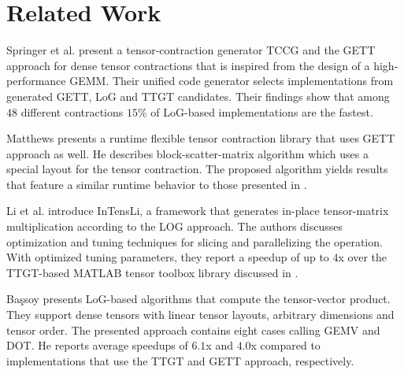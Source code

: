 \section{Related Work}
\label{sec:related}

\begin{comment}
The authors in \cite{dinapoli:2014:towards.efficient.use} discuss the efficient tensor contractions with highly optimized BLAS. 
Based on the LoG approach, they define requirements for the use of \tf{gemm} for class 3 tensor contractions and provide slicing techniques for tensors. %
The slicing recipe for the class 2 categorized tensor contractions contains a short description with a rule of thumb for maximizing performance.
Runtime measurements cover class 3 tensor contractions.
\end{comment}

Springer et al. \cite{springer:2018:design} present a tensor-contraction generator TCCG and the GETT approach for dense tensor contractions that is inspired from the design of a high-performance GEMM.
Their unified code generator selects implementations from generated GETT, LoG and TTGT candidates.
Their findings show that among $48$ different contractions $15$\% of LoG-based implementations are the fastest.

Matthews \cite{matthews:2018:high} presents a runtime flexible tensor contraction library that uses GETT approach as well.
He describes block-scatter-matrix algorithm which uses a special layout for the tensor contraction.
The proposed algorithm yields results that feature a similar runtime behavior to those presented in \cite{springer:2018:design}.

Li et al. \cite{li:2015:input} introduce InTensLi, a framework that generates in-place tensor-matrix multiplication according to the LOG approach. 
The authors discusses optimization and tuning techniques for slicing and parallelizing the operation.
With optimized tuning parameters, they report a speedup of up to $4$x over the TTGT-based MATLAB tensor toolbox library discussed in \cite{bader:2006:algorithm862}.

Ba\c{s}soy \cite{bassoy:2019:ttv} presents LoG-based algorithms that compute the tensor-vector product. 
They support dense tensors with linear tensor layouts, arbitrary dimensions and tensor order.
The presented approach contains eight cases calling GEMV and DOT.
He reports average speedups of $6.1$x and $4.0$x compared to implementations that use the TTGT and GETT approach, respectively.


